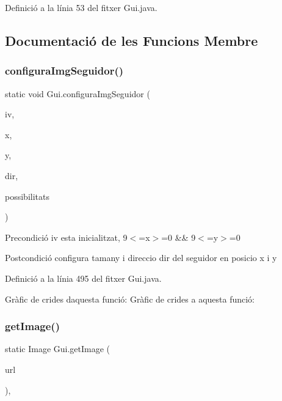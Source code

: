 Definició a la línia 53 del fitxer Gui.\+java.



\subsection{Documentació de les Funcions Membre}
\mbox{\label{class_gui_af2be44020696cbe2bce2ff4b90d94cc1}} 
\subsubsection{\texorpdfstring{configura\+Img\+Seguidor()}{configuraImgSeguidor()}}
{\footnotesize\ttfamily static void Gui.\+configura\+Img\+Seguidor (\begin{DoxyParamCaption}\item[{Image\+View}]{iv,  }\item[{int}]{x,  }\item[{int}]{y,  }\item[{char}]{dir,  }\item[{int}]{possibilitats }\end{DoxyParamCaption})\hspace{0.3cm}{\ttfamily [static]}}

\begin{DoxyPrecond}{Precondició}
iv esta inicialitzat, 9$<$=x$>$=0 \&\& 9$<$=y$>$=0 
\end{DoxyPrecond}
\begin{DoxyPostcond}{Postcondició}
configura tamany i direccio dir del seguidor en posicio x i y 
\end{DoxyPostcond}


Definició a la línia 495 del fitxer Gui.\+java.

Gràfic de crides d\textquotesingle{}aquesta funció\+:
Gràfic de crides a aquesta funció\+:
\mbox{\label{class_gui_a08cce94ed9a31122dadba010c4ebcb1c}} 
\subsubsection{\texorpdfstring{get\+Image()}{getImage()}}
{\footnotesize\ttfamily static Image Gui.\+get\+Image (\begin{DoxyParamCaption}\item[{String}]{url }\end{DoxyParamCaption})\hspace{0.3cm}{\ttfamily [static]}, {\ttfamily [private]}}

